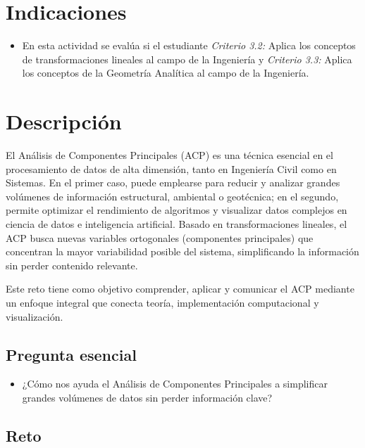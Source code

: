 \documentclass[a4,11pt]{aleph-notas}
\begin{document}
\encabezado

\section{Indicaciones}
\begin{itemize}[leftmargin=*]
\item 
    En esta actividad se evalúa si el estudiante \textit{Criterio 3.2:} Aplica los conceptos de transformaciones lineales al campo de la Ingeniería y \textit{Criterio 3.3:} Aplica los conceptos de la Geometría Analítica al campo de la Ingeniería.
\end{itemize}


\section{Descripción}

El Análisis de Componentes Principales (ACP) es una técnica esencial en el procesamiento de datos de alta dimensión, tanto en Ingeniería Civil como en Sistemas. En el primer caso, puede emplearse para reducir y analizar grandes volúmenes de información estructural, ambiental o geotécnica; en el segundo, permite optimizar el rendimiento de algoritmos y visualizar datos complejos en ciencia de datos e inteligencia artificial. Basado en transformaciones lineales, el ACP busca nuevas variables ortogonales (componentes principales) que concentran la mayor variabilidad posible del sistema, simplificando la información sin perder contenido relevante.

Este reto tiene como objetivo comprender, aplicar y comunicar el ACP mediante un enfoque integral que conecta teoría, implementación computacional y visualización.

\subsection*{Pregunta esencial}
\begin{itemize}[leftmargin=*]
\item ¿Cómo nos ayuda el Análisis de Componentes Principales a simplificar grandes volúmenes de datos sin perder información clave?
\end{itemize}

\subsection*{Reto}
\end{document}
